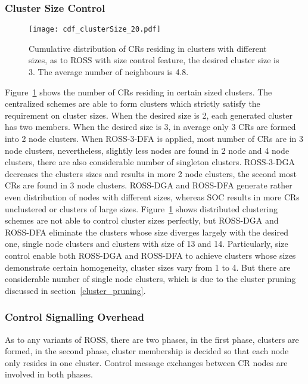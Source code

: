 

\subsubsection{Cluster Size Control}
\label{cluster_size}
\begin{figure}[h]
  \centering
  \texttt{[image: cdf\_clusterSize\_20.pdf]}
  \caption{Cumulative distribution of CRs residing in clusters with different sizes, as to ROSS with size control feature, the desired cluster size is 3. The average number of neighbours is 4.8.}
  \label{size_control}
\end{figure}
Figure~\ref{size_control} shows the number of CRs residing in certain sized clusters.
The centralized schemes are able to form clusters which strictly satisfy the requirement on cluster sizes.
When the desired size is 2, each generated cluster has two members.
When the desired size is 3, in average only 3 CRs are formed into 2 node clusters.
When ROSS-3-DFA is applied, most number of CRs are in 3 node clusters, nevertheless, slightly less nodes are found in 2 node and 4 node clusters, there are also considerable number of singleton clusters.
ROSS-3-DGA decreases the clusters sizes and results in more 2 node clusters, the second most CRs are found in 3 node clusters.
ROSS-DGA and ROSS-DFA generate rather even distribution of nodes with different sizes, whereas SOC results in more CRs unclustered or clusters of large sizes. 
Figure~\ref{size_control} shows distributed clustering schemes are not able to control cluster sizes perfectly, but ROSS-DGA and ROSS-DFA eliminate the clusters whose size diverges largely with the desired one, \ie single node clusters and clusters with size of 13 and 14.
Particularly, size control enable both ROSS-DGA and ROSS-DFA to achieve clusters whose sizes demonstrate certain homogeneity, \ie cluster sizes vary from 1 to 4.
But there are considerable number of single node clusters, which is due to the cluster pruning discussed in section~\ref{cluster_pruning}.

\subsubsection{Control Signalling Overhead}
As to any variants of ROSS, there are two phases, in the first phase, clusters are formed, in the second phase, cluster membership is decided so that each node only resides in one cluster.
Control message exchanges between CR nodes are involved in both phases.

